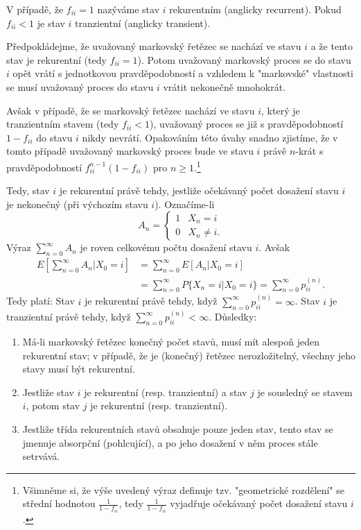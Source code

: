 \documentclass[10pt]{article}
\begin{document}
V případě, že $f_{ii}=1$ nazýváme stav $i$ rekurentním (anglicky recurrent). Pokud $f_{ii} < 1$ je stav $i$ tranzientní (anglicky transient).

Předpokládejme, že uvažovaný markovský řetězec se nachází ve stavu $i$ a že tento stav je rekurentní (tedy $f_{ii} = 1$). Potom uvažovaný markovský proces se do stavu $i$ opět vrátí s jednotkovou pravděpodobností a vzhledem k "markovské" vlastnosti se musí uvažovaný proces do stavu $i$ vrátit nekonečně mnohokrát.

Avšak v případě, že se markovský řetězec nachází ve stavu $i$, který je tranzientním stavem (tedy $f_{ii} < 1$), uvažovaný proces se již s pravděpodobností $1-f_{ii}$ do stavu $i$ nikdy nevrátí. Opakováním této úvahy snadno zjistíme, že v tomto případě uvažovaný markovský proces bude ve stavu $i$ právě $n$-krát s pravděpodobností $f_{ii}^{n-1}(1-f_{ii})$ pro $n \geq 1$.\footnote{Všimněme si, že výše uvedený výraz definuje tzv. "geometrické rozdělení" se střední hodnotou $\frac{1}{1-f_{ii}}$, tedy $\frac{1}{1-f_{ii}}$ vyjadřuje očekávaný počet dosažení stavu $i$.}

Tedy, stav $i$ je rekurentní právě tehdy, jestliže očekávaný počet dosažení stavu $i$ je nekonečný (při výchozím stavu $i$). Označíme-li
\begin{equation}
A_n = \begin{cases}
1& X_n=i\\
0& X_n \neq i.
\end{cases}
\end{equation}
Výraz $\sum_{n=0}^\infty A_n$ je roven celkovému počtu dosažení stavu $i$. Avšak
\begin{equation}
\begin{split}
E\left[\sum_{n=0}^\infty A_n|X_0=i\right]		&=\sum_{n=0}^\infty E[ A_n|X_0=i]\\
							&=\sum_{n=0}^\infty P\{X_n = i | X_0 = i\} = \sum_{n=0}^\infty p_{ii}^{(n)}.
\end{split}
\end{equation}
Tedy platí:
Stav $i$ je rekurentní právě tehdy, když $\sum_{n=0}^\infty p_{ii}^{(n)} = \infty$. Stav $i$ je tranzientní právě tehdy, když $\sum_{n=0}^\infty p_{ii}^{(n)} < \infty$.
Důsledky:
\begin{enumerate}
\item Má-li markovský řetězec konečný počet stavů, musí mít alespoň jeden rekurentní stav; v případě, že je (konečný) řetězec nerozložitelný, všechny jeho stavy musí být rekurentní.
\item Jestliže stav $i$ je rekurentní (resp. tranzientní) a stav $j$ je sousledný se stavem $i$, potom stav $j$ je rekurentní (resp. tranzientní).
\item Jestliže třída rekurentních stavů obsahuje pouze jeden stav, tento stav se jmenuje absorpční (pohlcující), a po jeho dosažení v něm proces stále setrvává.
\end{enumerate}
\end{document}
